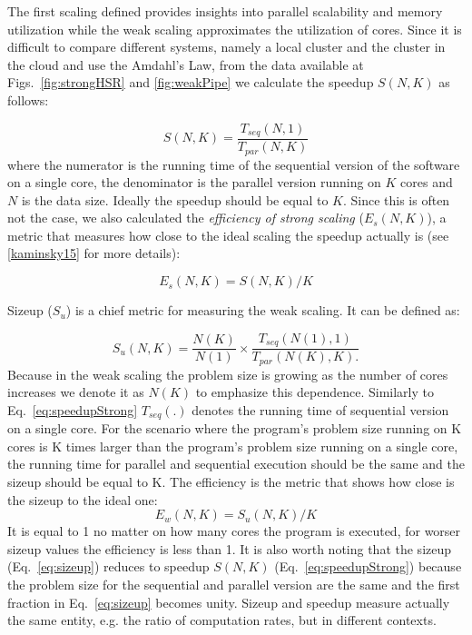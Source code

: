 \documentclass[3p,times]{elsarticle}
\begin{document}


The first scaling defined  provides insights into parallel scalability and memory utilization while the weak scaling approximates the utilization of cores. Since it is difficult to compare different systems, namely a local cluster and the cluster in the cloud and use the Amdahl's Law, from the data available at Figs.~\ref{fig:strongHSR} and \ref{fig:weakPipe} we calculate the speedup $S(N,K)$ as follows: 

\begin{equation}
\label{eq:speedupStrong}
S(N,K) = \frac{T_{seq}(N,1)}{T_{par}(N,K)}
\end{equation}
where the numerator is the running time of the sequential version of the software on a single core, the denominator is the parallel version running on $K$ cores and $N$ is the data size. Ideally the speedup should be equal to $K$. Since this is often not the case, we also calculated the \textit{efficiency of strong scaling} ($E_s(N,K)$), a metric that measures how close to the ideal scaling the speedup actually is (see \ref{kaminsky15} for more details):

$$
E_s(N,K) = S(N,K) / K
$$
 

Sizeup ($S_u$) is a chief metric for measuring the weak scaling. It can be defined as: 

\begin{equation}
\label{eq:sizeup}
S_u(N,K) = \frac{N(K)}{N(1)} \times \frac{T_{seq}(N(1),1)}{T_{par}(N(K),K).}
\end{equation}
Because in the weak scaling the problem size is growing as the number of cores increases we denote it as $N(K)$ to emphasize this dependence. Similarly to Eq.~\ref{eq:speedupStrong} $T_{seq}(.)$ denotes the running time of sequential version on a single core. For the scenario where the program's problem size running on K cores is K times larger than the program's problem size running on a single core, the running time for parallel and sequential execution should be the same and the sizeup should be equal to K. The efficiency is the metric that shows how close is the sizeup to the ideal one: 
$$
E_w(N,K) = S_u(N,K) / K
$$
It is equal to 1 no matter on how many cores the program is executed, for worser sizeup values the efficiency is less than 1. It is also worth noting that the sizeup (Eq.~\ref{eq:sizeup}) reduces to speedup $S(N,K)$ (Eq.~\ref{eq:speedupStrong}) because the problem size for the sequential and parallel version are the same and the first fraction in Eq.~\ref{eq:sizeup} becomes unity. Sizeup and speedup measure actually the same entity, e.g. the ratio of computation rates, but in different contexts.
\end{document}

